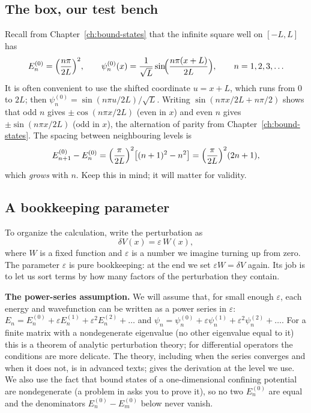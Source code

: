 \subsection{The box, our test bench}

Recall from Chapter~\ref{ch:bound-states} that the infinite square well on $[-L,L]$ has
\begin{equation}
E_n^{(0)}=\Bigl(\frac{n\pi}{2L}\Bigr)^2,\qquad
\psi_n^{(0)}(x)=\frac{1}{\sqrt L}\sin\!\Bigl(\frac{n\pi(x+L)}{2L}\Bigr),\qquad n=1,2,3,\dots
\label{eq:perturbation-box}
\end{equation}
It is often convenient to use the shifted coordinate $u=x+L$, which runs from 0 to $2L$; then $\psi_n^{(0)}=\sin(n\pi u/2L)/\sqrt L$. Writing $\sin(n\pi x/2L+n\pi/2)$ shows that odd $n$ gives $\pm\cos(n\pi x/2L)$ (even in $x$) and even $n$ gives $\pm\sin(n\pi x/2L)$ (odd in $x$), the alternation of parity from Chapter~\ref{ch:bound-states}. The spacing between neighbouring levels is
\begin{equation}
E_{n+1}^{(0)}-E_n^{(0)}=\Bigl(\frac{\pi}{2L}\Bigr)^2\bigl[(n+1)^2-n^2\bigr]=\Bigl(\frac{\pi}{2L}\Bigr)^2(2n+1),
\label{eq:perturbation-boxspacing}
\end{equation}
which \emph{grows} with $n$. Keep this in mind; it will matter for validity.

\subsection{A bookkeeping parameter}

To organize the calculation, write the perturbation as
\begin{equation}
\delta V(x)=\varepsilon\,W(x),
\label{eq:perturbation-epsW}
\end{equation}
where $W$ is a fixed function and $\varepsilon$ is a number we imagine turning up from zero. The parameter $\varepsilon$ is pure bookkeeping: at the end we set $\varepsilon W=\delta V$ again. Its job is to let us sort terms by how many factors of the perturbation they contain.

\begin{beyond}
\textbf{The power-series assumption.} We will assume that, for small enough $\varepsilon$, each energy and wavefunction can be written as a power series in $\varepsilon$:
$E_n=E_n^{(0)}+\varepsilon E_n^{(1)}+\varepsilon^2E_n^{(2)}+\dots$ and $\psi_n=\psi_n^{(0)}+\varepsilon\psi_n^{(1)}+\varepsilon^2\psi_n^{(2)}+\dots$.
For a finite matrix with a nondegenerate eigenvalue (no other eigenvalue equal to it) this is a theorem of analytic perturbation theory; for differential operators the conditions are more delicate. The theory, including when the series converges and when it does not, is in advanced texts; \cite{griffiths} gives the derivation at the level we use. We also use the fact that bound states of a one-dimensional confining potential are nondegenerate (a problem in \cite{griffiths} asks you to prove it), so no two $E_n^{(0)}$ are equal and the denominators $E_n^{(0)}-E_m^{(0)}$ below never vanish.
\end{beyond}

